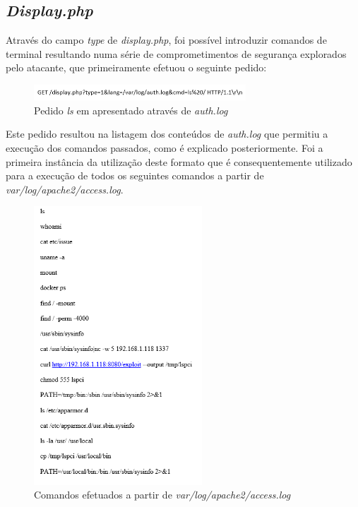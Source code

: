 \documentclass[10pt,english]{article}
\begin{document}
\subsection{\textit{Display.php}}
\par Através do campo \textit{type} de \textit{display.php}, foi possível introduzir comandos de terminal resultando numa série de comprometimentos de segurança explorados pelo atacante, que primeiramente efetuou o seguinte pedido:
\begin{figure}[h]
    \centering
    \includegraphics[width=300]{images/GetAuthLog.png}
    \caption{Pedido \textit{ls} em apresentado através de \textit{auth.log}}
\end{figure}
\par Este pedido resultou na listagem dos conteúdos de \textit{auth.log} que permitiu a execução dos comandos passados, como é explicado posteriormente. Foi a primeira instância da utilização deste formato que é consequentemente utilizado para a execução de todos os seguintes comandos a partir de \textit{var/log/apache2/access.log}.
\begin{figure}[h]
    \centering
    \includegraphics[width=238]{images/ComandosApache2Log.png}
    \caption{Comandos efetuados a partir de \textit{var/log/apache2/access.log}}
\end{figure}
\end{document}
